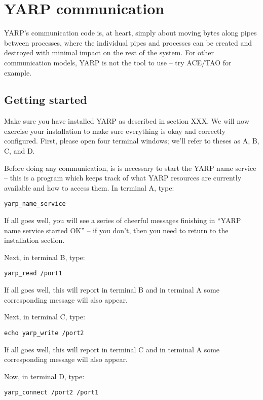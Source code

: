 
\section{YARP communication}

YARP's communication code is, at heart, simply about moving bytes
along pipes between processes, where the individual pipes and
processes can be created and destroyed with minimal impact on the
rest of the system.  For other communication models, YARP is not
the tool to use -- try ACE/TAO for example.

\subsection{Getting started}

Make sure you have installed YARP as described in section XXX.
We will now exercise your installation to make sure everything
is okay and correctly configured.  First, please open four terminal
windows; we'll refer to theses as A, B, C, and D.  

Before doing any communication, is is necessary to start the YARP name
service -- this is a program which keeps track of what YARP resources
are currently available and how to access them.
%
In terminal A, type:

\begin{verbatim}
yarp_name_service
\end{verbatim}

If all goes well, you will see a series of cheerful messages finishing
in ``YARP name service started OK'' -- if you don't, then you need to
return to the installation section.

Next, in terminal B, type:
%
\begin{verbatim}
yarp_read /port1
\end{verbatim}
%
If all goes well, this will report  in
terminal B and in terminal A some corresponding message will also appear.

Next, in terminal C, type:

\begin{verbatim}
echo yarp_write /port2
\end{verbatim}

If all goes well, this will report  in
terminal C and in terminal A some corresponding message will also appear.

Now, in terminal D, type:

\begin{verbatim}
yarp_connect /port2 /port1
\end{verbatim}

